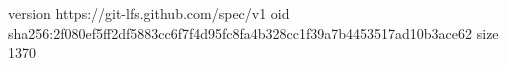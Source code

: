 version https://git-lfs.github.com/spec/v1
oid sha256:2f080ef5ff2df5883cc6f7f4d95fc8fa4b328cc1f39a7b4453517ad10b3ace62
size 1370
